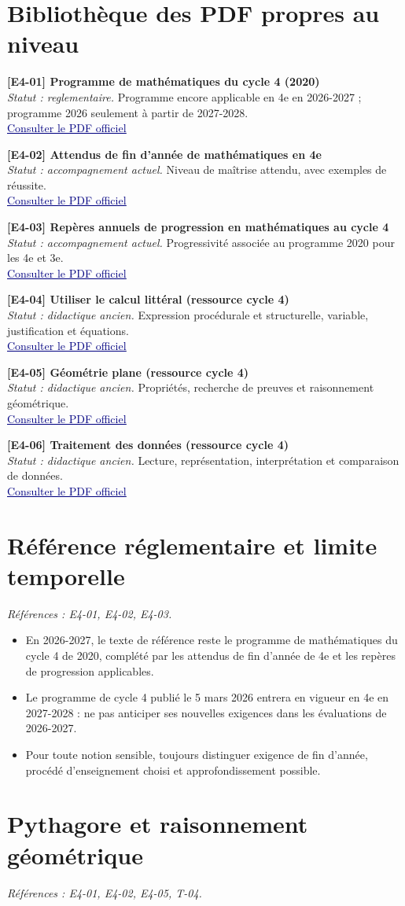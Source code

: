 \documentclass[11pt,a4paper]{article}
\newcommand{\refsource}[1]{\textsf{\textcolor{slate}{[#1]}}}
\newcommand{\sectionref}[2]{\section{#1}\textit{Références : #2.}\par}
\newcommand{\entreesource}[5]{\par\noindent\textbf{\refsource{#1} #2}\\[-2pt]\textit{Statut : #3.} #4\\[-2pt]\href{#5}{\textcolor{navy}{\underline{Consulter le PDF officiel}}}\par\smallskip}
\begin{document}
\section{Bibliothèque des PDF propres au niveau}
\entreesource{E4-01}{Programme de mathématiques du cycle 4 (2020)}{reglementaire}{Programme encore applicable en 4e en 2026-2027 ; programme 2026 seulement à partir de 2027-2028.}{https://eduscol.education.fr/document/621/download}
\entreesource{E4-02}{Attendus de fin d’année de mathématiques en 4e}{accompagnement actuel}{Niveau de maîtrise attendu, avec exemples de réussite.}{https://eduscol.education.gouv.fr/sites/default/files/document/16-maths-4e-attendus-eduscol1114746pdf-74682.pdf}
\entreesource{E4-03}{Repères annuels de progression en mathématiques au cycle 4}{accompagnement actuel}{Progressivité associée au programme 2020 pour les 4e et 3e.}{https://eduscol.education.gouv.fr/sites/default/files/document/26-maths-c4-reperes-eduscol1114756pdf-74694.pdf}
\entreesource{E4-04}{Utiliser le calcul littéral (ressource cycle 4)}{didactique ancien}{Expression procédurale et structurelle, variable, justification et équations.}{https://eduscol.education.gouv.fr/sites/default/files/document/ra16c4mathnombrescalculcalcullitteraldocmaitre548358pdf-77631.pdf}
\entreesource{E4-05}{Géométrie plane (ressource cycle 4)}{didactique ancien}{Propriétés, recherche de preuves et raisonnement géométrique.}{https://eduscol.education.gouv.fr/sites/default/files/document/ra16c4mathgeoplanedocmaitre574312pdf-77673.pdf}
\entreesource{E4-06}{Traitement des données (ressource cycle 4)}{didactique ancien}{Lecture, représentation, interprétation et comparaison de données.}{https://eduscol.education.gouv.fr/sites/default/files/document/ra16c4mathdocmaitre564036pdf-77637.pdf}
\sectionref{Référence réglementaire et limite temporelle}{E4-01, E4-02, E4-03}
\begin{itemize}
\item En 2026-2027, le texte de référence reste le programme de mathématiques du cycle 4 de 2020, complété par les attendus de fin d’année de 4e et les repères de progression applicables.
\item Le programme de cycle 4 publié le 5 mars 2026 entrera en vigueur en 4e en 2027-2028 : ne pas anticiper ses nouvelles exigences dans les évaluations de 2026-2027.
\item Pour toute notion sensible, toujours distinguer exigence de fin d’année, procédé d’enseignement choisi et approfondissement possible.
\end{itemize}
\sectionref{Pythagore et raisonnement géométrique}{E4-01, E4-02, E4-05, T-04}
\end{document}
